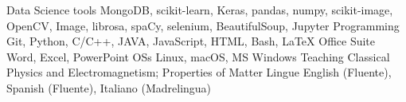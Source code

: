 

\begin{cvskills}
  \cvskill
    {Data Science tools}
    {MongoDB, scikit-learn, Keras, pandas, numpy, scikit-image, OpenCV, Image, librosa, spaCy, selenium, BeautifulSoup, Jupyter}
  \cvskill
    {Programming} %
    {Git, Python, C/C++, JAVA, JavaScript, HTML, Bash, LaTeX} %
  \cvskill
    {Office Suite}
    {Word, Excel, PowerPoint}
  \cvskill
    {OSs}
    {Linux, macOS, MS Windows}
  \cvskill
    {Teaching}
    {Classical Physics and Electromagnetism; Properties of Matter}
  \cvskill
    {Lingue} %
    {English (Fluente), Spanish (Fluente), Italiano (Madrelingua)} %
\end{cvskills}
